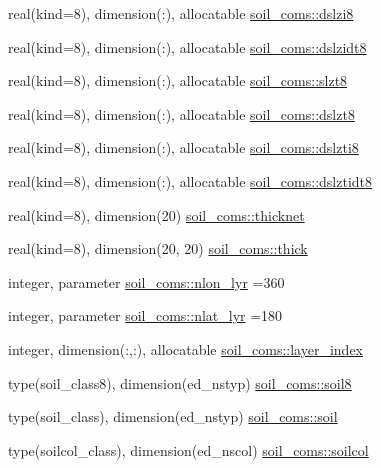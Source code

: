 \begin{DoxyCompactItemize}
real(kind=8), dimension(\+:), allocatable \hyperlink{namespacesoil__coms_ad8684255b655da1970dfa6f829724dce}{soil\+\_\+coms\+::dslzi8}
\item 
real(kind=8), dimension(\+:), allocatable \hyperlink{namespacesoil__coms_ab5f252a1d4e385eaa66e06a4e7de7bc9}{soil\+\_\+coms\+::dslzidt8}
\item 
real(kind=8), dimension(\+:), allocatable \hyperlink{namespacesoil__coms_a93fd7b06c92beb4d98c9c197b1d7b445}{soil\+\_\+coms\+::slzt8}
\item 
real(kind=8), dimension(\+:), allocatable \hyperlink{namespacesoil__coms_a7b1c34644ae733852ef371e7764e23d1}{soil\+\_\+coms\+::dslzt8}
\item 
real(kind=8), dimension(\+:), allocatable \hyperlink{namespacesoil__coms_ad8c0bc69f2eebddc89763e0789953239}{soil\+\_\+coms\+::dslzti8}
\item 
real(kind=8), dimension(\+:), allocatable \hyperlink{namespacesoil__coms_aed792678a3757670fef365202ee15c39}{soil\+\_\+coms\+::dslztidt8}
\item 
real(kind=8), dimension(20) \hyperlink{namespacesoil__coms_a82fb9ea0980b1bf483abde43cb04cbd3}{soil\+\_\+coms\+::thicknet}
\item 
real(kind=8), dimension(20, 20) \hyperlink{namespacesoil__coms_a5e41e535957c9e40c2836496d007477f}{soil\+\_\+coms\+::thick}
\item 
integer, parameter \hyperlink{namespacesoil__coms_a8430352c5e4200574649e445fbe0e682}{soil\+\_\+coms\+::nlon\+\_\+lyr} =360
\item 
integer, parameter \hyperlink{namespacesoil__coms_ab0f3f3665b8b408861fcded1094fa91c}{soil\+\_\+coms\+::nlat\+\_\+lyr} =180
\item 
integer, dimension(\+:,\+:), allocatable \hyperlink{namespacesoil__coms_a09e8408810b16557b7bcc84cd165645a}{soil\+\_\+coms\+::layer\+\_\+index}
\item 
type(soil\+\_\+class8), dimension(ed\+\_\+nstyp) \hyperlink{namespacesoil__coms_a5d71d43e3458fde6c6f89d29af5225c8}{soil\+\_\+coms\+::soil8}
\item 
type(soil\+\_\+class), dimension(ed\+\_\+nstyp) \hyperlink{namespacesoil__coms_a18bef58fe90e83fad032983a8e079a60}{soil\+\_\+coms\+::soil}
\item 
type(soilcol\+\_\+class), dimension(ed\+\_\+nscol) \hyperlink{namespacesoil__coms_a90e160d33d6fa2c289ce1742bc852139}{soil\+\_\+coms\+::soilcol}
\item 

\end{DoxyCompactItemize}
